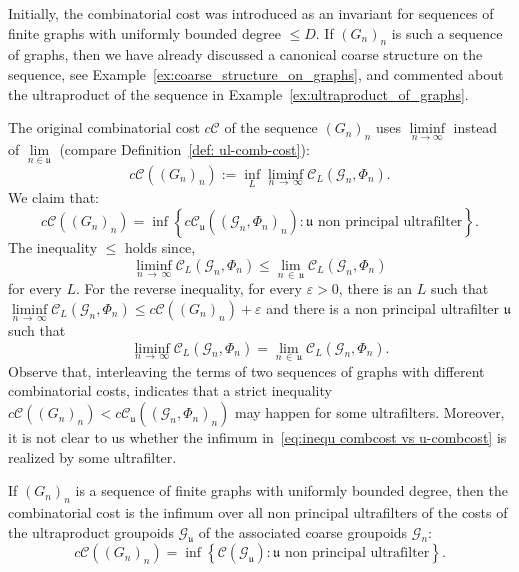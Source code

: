 \documentclass[AHL,Unicode,longabstracts,published]{cedram}
\newcommand{\cost}{\mathcal{C}}
\newcommand{\ccost}{c\mathcal{C}}
\newcommand{\cg}{\mathcal{G}}
\newcommand{\ul}{\mathfrak{u}}
\begin{document}
\begin{rema}\label{Rem: Elek comb cost}
Initially, the combinatorial cost \cite{Elek-combinatorial-cost-2007} was introduced as an invariant for sequences of finite graphs with uniformly bounded degree $\leq D$. If $(G_n)_n$ is such a sequence of graphs, then we have already discussed a canonical coarse structure on the sequence, see Example~\ref{ex:coarse_structure_on_graphs}, and commented about the ultraproduct of the sequence in Example~\ref{ex:ultraproduct_of_graphs}.

The original combinatorial cost $\ccost$ of the sequence $(G_n)_n$ uses $\liminf\limits_{n\to \infty}$ instead of $\lim\limits_{n\in \ul}$ (compare Definition~\ref{def: ul-comb-cost}):
\begin{equation}\label{def: init Elek comb cost with liminf}
\ccost((G_n)_n):=\inf_L\liminf\limits_{n\,\to\,\infty}\cost_L(\cg_n,\Phi_n).
\end{equation}
We claim that:
\begin{equation}\label{eq:inequ combcost vs u-combcost}
\ccost((G_n)_n) = \inf \left\{\ccost_{\ul}((\cg_n,\Phi_n)_n) : \ul \text{ non principal ultrafilter}\right\}.
\end{equation}
The inequality $\leq $ holds since,
\[
\liminf\limits_{n\,\to\,\infty}\cost_L(\cg_n,\Phi_n)\leq \lim\limits_{n\,\in\,\ul}\cost_L(\cg_n,\Phi_n)
\]
for every $L$. For the reverse inequality, for every $\varepsilon>0$, there is an $L$ such that $\liminf\limits_{n\,\to \,\infty}\cost_L(\cg_n,\Phi_n)\leq \ccost((G_n)_n) +\varepsilon$ and there is a non principal ultrafilter $\ul$ such that
\[
\liminf\limits_{n\,\to\,\infty}\cost_L(\cg_n,\Phi_n)=\lim\limits_{n\,\in\,\ul}\cost_L(\cg_n,\Phi_n).
\]
Observe that, interleaving the terms of two sequences of graphs with different combinatorial costs, indicates that a strict inequality $\ccost((G_n)_n) <\ccost_{\ul}((\cg_n,\Phi_n)_n)$ may happen for some ultrafilters. Moreover, it is not clear to us whether the infimum in~\eqref{eq:inequ combcost vs u-combcost} is realized by some ultrafilter.
\end{rema}


\begin{coro}\label{cor: combcost vs cost}
If $(G_n)_n$ is a sequence of finite graphs with uniformly bounded degree, then the combinatorial cost is the infimum over all non principal ultrafilters of the costs of the ultraproduct groupoids $\cg_\ul$ of the associated coarse groupoids $\cg_n$:
\[
\ccost((G_n)_n) = \inf \left\{\cost(\cg_{\ul}) : \ul \text{ non principal ultrafilter}\right\}.
\]
\end{coro}
\end{document}
